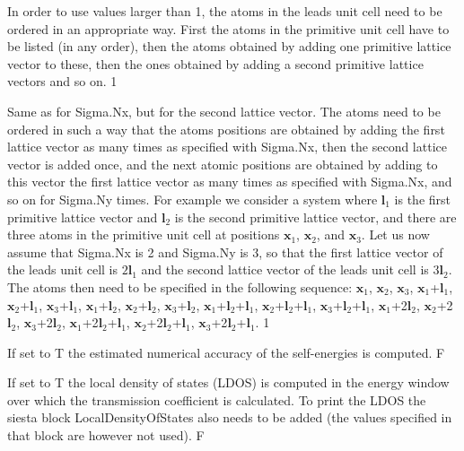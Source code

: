 \documentclass[11pt]{article}
\begin{document}
{{In order to use values larger than 1, the atoms in the leads unit cell need to be ordered in an appropriate way. First the atoms in the primitive unit cell have to be listed (in any order), then the atoms obtained by adding one primitive lattice vector to these, then the ones obtained by adding a second primitive lattice vectors and so on.}
{1}

\newpage
{}
{Same as for Sigma.Nx, but for the second lattice vector. The atoms need to be ordered in such a way that the atoms positions are obtained by adding the first lattice vector as many times as specified with Sigma.Nx, then the second lattice vector is added once, and the next atomic positions are obtained by adding to this vector the first lattice vector as many times as specified with Sigma.Nx, and so on for Sigma.Ny times. For example we consider a system where $\mathbf{l}_1$ is the first primitive lattice vector and $\mathbf{l}_2$ is the second primitive lattice vector, and there are three atoms in the primitive unit cell at positions $\mathbf{x}_1$, $\mathbf{x}_2$, and $\mathbf{x}_3$. Let us now assume that Sigma.Nx is 2 and Sigma.Ny is 3, so that the first lattice vector of the leads unit cell is $2\mathbf{l}_1$ and the second lattice vector of the leads unit cell is $3\mathbf{l}_2$. The atoms then need to be specified in the following sequence:
$\mathbf{x}_1$, $\mathbf{x}_2$, $\mathbf{x}_3$,
$\mathbf{x}_1$+$\mathbf{l}_1$, $\mathbf{x}_2$+$\mathbf{l}_1$, $\mathbf{x}_3$+$\mathbf{l}_1$,
$\mathbf{x}_1$+$\mathbf{l}_2$, $\mathbf{x}_2$+$\mathbf{l}_2$, $\mathbf{x}_3$+$\mathbf{l}_2$,
$\mathbf{x}_1$+$\mathbf{l}_2$+$\mathbf{l}_1$, $\mathbf{x}_2$+$\mathbf{l}_2$+$\mathbf{l}_1$, $\mathbf{x}_3$+$\mathbf{l}_2$+$\mathbf{l}_1$,
$\mathbf{x}_1$+2$\mathbf{l}_2$, $\mathbf{x}_2$+2$\mathbf{l}_2$, $\mathbf{x}_3$+2$\mathbf{l}_2$,
$\mathbf{x}_1$+2$\mathbf{l}_2$+$\mathbf{l}_1$, $\mathbf{x}_2$+2$\mathbf{l}_2$+$\mathbf{l}_1$, $\mathbf{x}_3$+2$\mathbf{l}_2$+$\mathbf{l}_1$.
}
{1}

{If set to T the estimated numerical accuracy of the self-energies is computed.}
{F}

{If set to T the local density of states (LDOS) is computed in the energy window over which the transmission coefficient is calculated. To print the LDOS the siesta block LocalDensityOfStates also needs to be added (the values specified in that block are however not used).}
{F}


}
\end{document}
